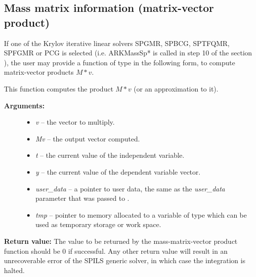 \documentclass[letterpaper,10pt,english]{sphinxmanual}
\begin{document}
\subsection{Mass matrix information (matrix-vector product)}
\label{c_interface/User_supplied:mass-matrix-information-matrix-vector-product}\label{c_interface/User_supplied:cinterface-mtimesfn}
If one of the Krylov iterative linear solvers SPGMR, SPBCG, SPTFQMR,
SPFGMR or PCG is selected (i.e. ARKMassSp* is called in step 10 of the
section {\hyperref[c_interface/Skeleton:cinterface-skeleton]{\emph{}}}), the user may provide a function
of type {\hyperref[c_interface/User_supplied:c.ARKSpilsMassTimesVecFn]{\emph{}}} in the following form, to
compute matrix-vector products \(M*v\).

\begin{fulllineitems}
\label{c_interface/User_supplied:c.ARKSpilsMassTimesVecFn}
This function computes the product \(M*v\) (or an approximation to it).
\begin{description}
\item[{\textbf{Arguments:}}] \leavevmode\begin{itemize}
\item {} 
\emph{v} -- the vector to multiply.

\item {} 
\emph{Mv} -- the output vector computed.

\item {} 
\emph{t} -- the current value of the independent variable.

\item {} 
\emph{y} -- the current value of the dependent variable vector.

\item {} 
\emph{user\_data} -- a pointer to user data, the same as the
\emph{user\_data} parameter that was passed to {\hyperref[c_interface/User_callable:c.ARKodeSetUserData]{\emph{}}}.

\item {} 
\emph{tmp} -- pointer to memory allocated to a variable of type
 which can be used as temporary storage or work space.

\end{itemize}

\end{description}

\textbf{Return value:}
The value to be returned by the mass-matrix-vector product
function should be 0 if successful. Any other return value will
result in an unrecoverable error of the SPILS generic solver,
in which case the integration is halted.

\end{fulllineitems}
\end{document}
